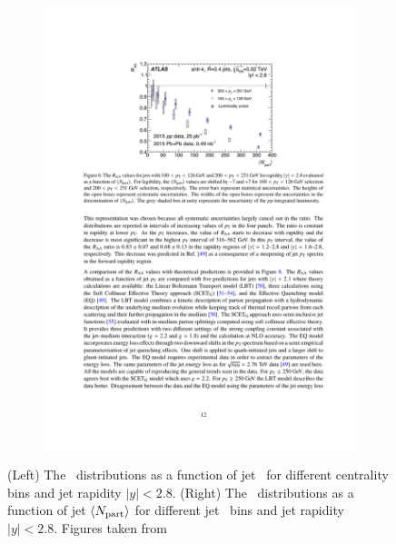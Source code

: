\begin{figure}
\begin{subfigure}{.45\textwidth}
\includegraphics[width=\textwidth]{figures/jetMeasurements/raa_centDep}
\caption{}
\label{fig:raa_centDep_atlas}
\end{subfigure}
\caption{(Left) The \RAA\ distributions as a function of jet \pt\ for different centrality bins and jet rapidity $|y| < 2.8$.
(Right) The \RAA\ distributions as a function of jet $\langle \mbox{$N_{\mathrm{part}}$} \rangle$ for different jet \pt\ bins and jet rapidity $|y| < 2.8$.
Figures taken from \cite{2019108}}
\label{fig:atlas_jet_raa}
\end{figure}

